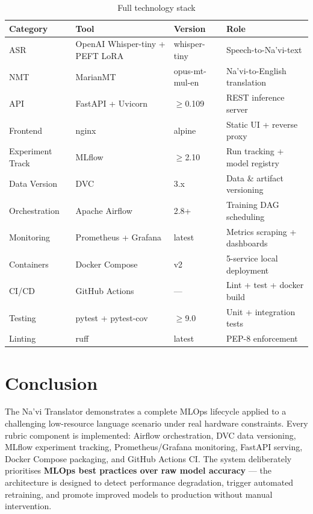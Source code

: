 \documentclass[12pt,a4paper]{article}
\begin{document}
\begin{table}[H]
  \centering
  \caption{Full technology stack}
  \begin{tabular}{@{}L{3cm}L{4cm}L{2.5cm}L{4.5cm}@{}}
    \toprule
    \textbf{Category} & \textbf{Tool} & \textbf{Version} & \textbf{Role} \\
    \midrule
    ASR              & OpenAI Whisper-tiny + PEFT LoRA & whisper-tiny    & Speech-to-Na'vi-text \\
    NMT              & MarianMT                        & opus-mt-mul-en  & Na'vi-to-English translation \\
    API              & FastAPI + Uvicorn               & $\geq$0.109     & REST inference server \\
    Frontend         & nginx                           & alpine          & Static UI + reverse proxy \\
    Experiment Track & MLflow                          & $\geq$2.10      & Run tracking + model registry \\
    Data Version     & DVC                             & 3.x             & Data \& artifact versioning \\
    Orchestration    & Apache Airflow                  & 2.8+            & Training DAG scheduling \\
    Monitoring       & Prometheus + Grafana            & latest          & Metrics scraping + dashboards \\
    Containers       & Docker Compose                  & v2              & 5-service local deployment \\
    CI/CD            & GitHub Actions                  & ---             & Lint + test + docker build \\
    Testing          & pytest + pytest-cov             & $\geq$9.0       & Unit + integration tests \\
    Linting          & ruff                            & latest          & PEP-8 enforcement \\
    \bottomrule
  \end{tabular}
\end{table}

\section{Conclusion}

The Na'vi Translator demonstrates a complete MLOps lifecycle applied to a challenging
low-resource language scenario under real hardware constraints. Every rubric component
is implemented: Airflow orchestration, DVC data versioning, MLflow experiment tracking,
Prometheus/Grafana monitoring, FastAPI serving, Docker Compose packaging, and GitHub
Actions CI. The system deliberately prioritises \textbf{MLOps best practices over raw
model accuracy} --- the architecture is designed to detect performance degradation,
trigger automated retraining, and promote improved models to production without manual
intervention.
\end{document}
